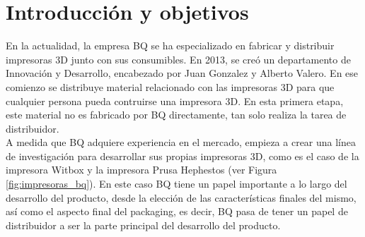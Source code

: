 \chapter{Introducción y objetivos}
\label{cap:introduccion}

En la actualidad, la empresa BQ se ha especializado en fabricar y distribuir impresoras 3D junto con sus consumibles. En 2013, se creó un departamento de Innovación y Desarrollo, encabezado por Juan Gonzalez y Alberto Valero. En ese comienzo se distribuye material relacionado con las impresoras 3D para que cualquier persona pueda contruirse una impresora 3D. En esta primera etapa, este material no es fabricado por BQ directamente, tan solo realiza la tarea de distribuidor.\\

A medida que BQ adquiere experiencia en el mercado, empieza a crear una línea de investigación para desarrollar sus propias impresoras 3D, como es el caso de la impresora Witbox y la impresora Prusa Hephestos (ver Figura \ref{fig:impresoras_bq}). En este caso BQ tiene un papel importante a lo largo del desarrollo del producto, desde la elección de las características finales del mismo, así como el aspecto final del packaging, es decir, BQ pasa de tener un papel de distribuidor a ser la parte principal del desarrollo del producto.


